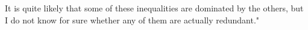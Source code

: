 It is quite likely that some of these inequalities are dominated by the others, but I do not know for sure whether any of them are actually redundant."

